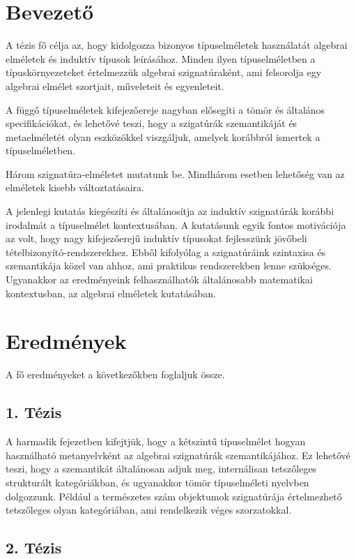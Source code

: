 \documentclass[12pt]{article}
\begin{document}
\section{Bevezető}

A tézis fő célja az, hogy kidolgozza bizonyos típuselméletek használatát
algebrai elméletek és induktív típusok leírásához. Minden ilyen típuselméletben
a típuskörnyezeteket értelmezzük algebrai szignatúraként, ami felsorolja
egy algebrai elmélet szortjait, műveleteit és egyenleteit.

A függő típuselméletek kifejezőereje nagyban elősegíti a tömör és általános
specifikációkat, és lehetővé teszi, hogy a szigatúrák szemantikáját és
metaelméletét olyan eszközökkel viszgáljuk, amelyek korábbról ismertek a
típuselméletben.

Három szignatúra-elméletet mutatunk be. Mindhárom esetben lehetőség van az
elméletek kisebb változtatásaira.

A jelenlegi kutatás kiegészíti és általánosítja az induktív szignatúrák korábbi
irodalmát a típuselmélet kontextusában. A kutatásunk egyik fontos motivációja az
volt, hogy nagy kifejezőerejű induktív típusokat fejlesszünk jövőbeli
tételbizonyító-rendszerekhez. Ebből kifolyólag a szignatúráink szintaxisa és
szemantikája közel van ahhoz, ami praktikus rendszerekben lenne
szükséges. Ugyanakkor az eredményeink felhasználhatók általánosabb matematikai
kontextusban, az algebrai elméletek kutatásában.

\section{Eredmények}

A fő eredményeket a következőkben foglaljuk össze.

\subsection*{1. Tézis}

A harmadik fejezetben kifejtjük, hogy a kétszintű típuselmélet \cite{twolevel}
hogyan használható metanyelvként az algebrai szignatúrák szemantikájához. Ez
lehetővé teszi, hogy a szemantikát általánosan adjuk meg, internálisan tetszőleges
strukturált kategóriákban, és ugyanakkor tömör típuselméleti nyelvben
dolgozzunk. Például a természetes szám objektumok szignatúrája értelmezhető
tetszőleges olyan kategóriában, ami rendelkezik véges szorzatokkal.

\subsection*{2. Tézis}
\end{document}
